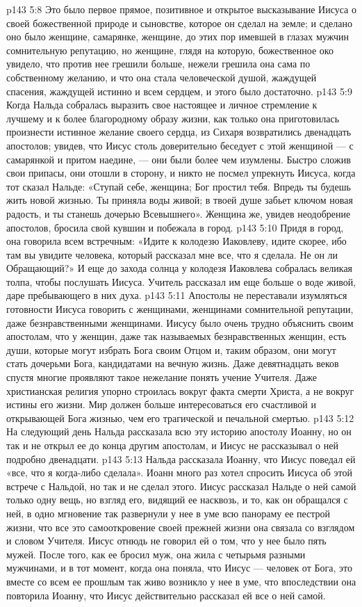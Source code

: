 \vs p143 5:8 Это было первое прямое, позитивное и открытое высказывание Иисуса о своей божественной природе и сыновстве, которое он сделал на земле; и сделано оно было женщине, самарянке, женщине, до этих пор имевшей в глазах мужчин сомнительную репутацию, но женщине, глядя на которую, божественное око увидело, что против нее грешили больше, нежели грешила она сама по собственному желанию, и что  она стала человеческой душой, жаждущей спасения, жаждущей истинно и всем сердцем, и этого было достаточно.
\vs p143 5:9 Когда Нальда собралась выразить свое настоящее и личное стремление к лучшему и к более благородному образу жизни, как только она приготовилась произнести истинное желание своего сердца, из Сихаря возвратились двенадцать апостолов; увидев, что Иисус столь доверительно беседует с этой женщиной --- с самарянкой и притом наедине, --- они были более чем изумлены. Быстро сложив свои припасы, они отошли в сторону, и никто не посмел упрекнуть Иисуса, когда тот сказал Нальде: «Ступай себе, женщина; Бог простил тебя. Впредь ты будешь жить новой жизнью. Ты приняла воды живой; в твоей душе забьет ключом новая радость, и ты станешь дочерью Всевышнего». Женщина же, увидев неодобрение апостолов, бросила свой кувшин и побежала в город.
\vs p143 5:10 Придя в город, она говорила всем встречным: «Идите к колодезю Иаковлеву, идите скорее, ибо там вы увидите человека, который рассказал мне все, что я сделала. Не он ли Обращающий?» И еще до захода солнца у колодезя Иаковлева собралась великая толпа, чтобы послушать Иисуса. Учитель рассказал им еще больше о воде живой, даре пребывающего в них духа.
\vs p143 5:11 Апостолы не переставали изумляться готовности Иисуса говорить с женщинами, женщинами сомнительной репутации, даже безнравственными женщинами. Иисусу было очень трудно объяснить своим апостолам, что у женщин, даже так называемых безнравственных женщин, есть души, которые могут избрать Бога своим Отцом и, таким образом, они могут стать дочерьми Бога, кандидатами на вечную жизнь. Даже девятнадцать веков спустя многие проявляют такое нежелание понять учение Учителя. Даже христианская религия упорно строилась вокруг факта смерти Христа, а не вокруг истины его жизни. Мир должен больше интересоваться его счастливой и открывающей Бога жизнью, чем его трагической и печальной смертью.
\vs p143 5:12 На следующий день Нальда рассказала всю эту историю апостолу Иоанну, но он так и не открыл ее до конца другим апостолам, и Иисус не рассказывал о ней подробно двенадцати.
\vs p143 5:13 Нальда рассказала Иоанну, что Иисус поведал ей «все, что я когда\hyp{}либо сделала». Иоанн много раз хотел спросить Иисуса об этой встрече с Нальдой, но так и не сделал этого. Иисус рассказал Нальде о ней самой только одну вещь, но взгляд его, видящий ее насквозь, и то, как он обращался с ней, в одно мгновение так развернули у нее в уме всю панораму ее пестрой жизни, что все это самооткровение своей прежней жизни она связала со взглядом и словом Учителя. Иисус отнюдь не говорил ей о том, что у нее было пять мужей. После того, как ее бросил муж, она жила с четырьмя разными мужчинами, и в тот момент, когда она поняла, что Иисус --- человек от Бога, это вместе со всем ее прошлым так живо возникло у нее в уме, что впоследствии она повторила Иоанну, что Иисус действительно рассказал ей все о ней самой.
